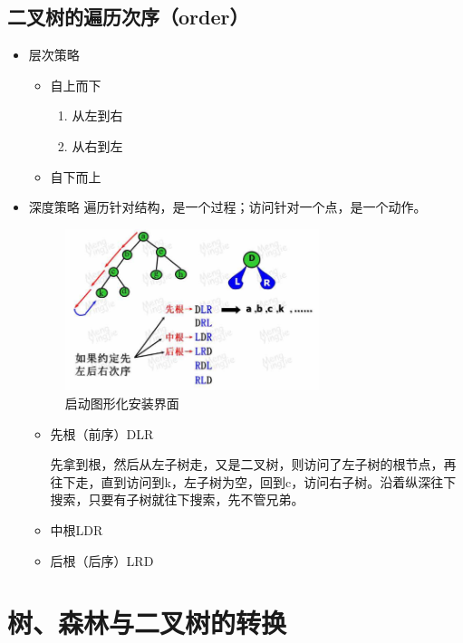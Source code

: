 \documentclass[AutoFakeBold]{LZUThesis2007}
\begin{document}
		\subsection{二叉树的遍历次序（order）}
			\begin{itemize}
				\item 层次策略
					\begin{itemize}
						\item 自上而下
							\begin{enumerate}
								\item 从左到右
								\item 从右到左
							\end{enumerate}
						\item 自下而上
					\end{itemize}
				\item 深度策略
				遍历针对结构，是一个过程；访问针对一个点，是一个动作。
				\begin{figure}[H]
				    \centering
				    \includegraphics[width=0.7\textwidth]{figures/7.2.png}
				    \caption{启动图形化安装界面}
				    \label{fig_install_texlive}
				\end{figure}
				\begin{itemize}
					\item 先根（前序）DLR

					先拿到根，然后从左子树走，又是二叉树，则访问了左子树的根节点，再往下走，直到访问到k，左子树为空，回到c，访问右子树。沿着纵深往下搜索，只要有子树就往下搜索，先不管兄弟。
					\item 中根LDR
					\item 后根（后序）LRD
				\end{itemize}

			\end{itemize}

	\section{树、森林与二叉树的转换}
\end{document}
